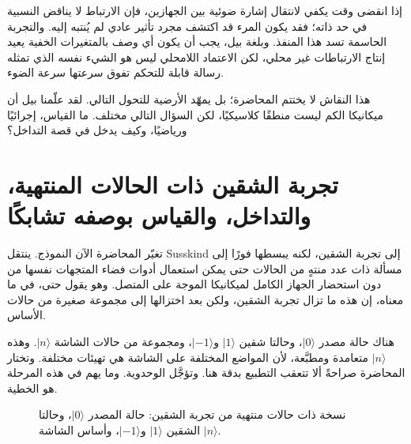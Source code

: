 إذا انقضى وقت يكفي لانتقال إشارة ضوئية بين الجهازين، فإن الارتباط لا يناقض النسبية في حد ذاته؛ فقد يكون المرء قد اكتشف مجرد تأثير عادي لم يُنتبه إليه. والتجربة الحاسمة تسد هذا المنفذ. وبلغة بيل، يجب أن يكون أي وصف بالمتغيرات الخفية يعيد إنتاج الارتباطات غير محلي، لكن الاعتماد اللامحلي ليس هو الشيء نفسه الذي تمثله رسالة قابلة للتحكم تفوق سرعتها سرعة الضوء.

\begin{classroomqa}
\end{classroomqa}

هذا النقاش لا يختتم المحاضرة؛ بل يمهّد الأرضية للتحول التالي. لقد علّمنا بيل أن ميكانيكا الكم ليست منطقًا كلاسيكيًا، لكن السؤال التالي مختلف. ما القياس، إجرائيًا ورياضيًا، وكيف يدخل في قصة التداخل؟

\section{تجربة الشقين ذات الحالات المنتهية، والتداخل، والقياس بوصفه تشابكًا}

تغيّر المحاضرة الآن النموذج. ينتقل Susskind إلى تجربة الشقين، لكنه يبسطها فورًا إلى مسألة ذات عدد منتهٍ من الحالات حتى يمكن استعمال أدوات فضاء المتجهات نفسها من دون استحضار الجهاز الكامل لميكانيكا الموجة على المتصل. وهو يقول حتى، في ما معناه، إن هذه ما تزال تجربة الشقين، ولكن بعد اختزالها إلى مجموعة صغيرة من حالات الأساس.

هناك حالة مصدر \(|0\rangle\)، وحالتا شقين \(|1\rangle\) و\(|-1\rangle\)، ومجموعة من حالات الشاشة \(|n\rangle\). وهذه \(|n\rangle\) متعامدة ومطبَّعة، لأن المواضع المختلفة على الشاشة هي تهيئات مختلفة. وتختار المحاضرة صراحةً ألا تتعقب التطبيع بدقة هنا. وتؤجَّل الوحدوية. وما يهم في هذه المرحلة هو الخطية.

\begin{figure}[htbp]
\centering
{}
\caption{نسخة ذات حالات منتهية من تجربة الشقين: حالة المصدر \(|0\rangle\)، وحالتا الشقين \(|1\rangle\) و\(|-1\rangle\)، وأساس الشاشة \(|n\rangle\).}
\end{figure}

